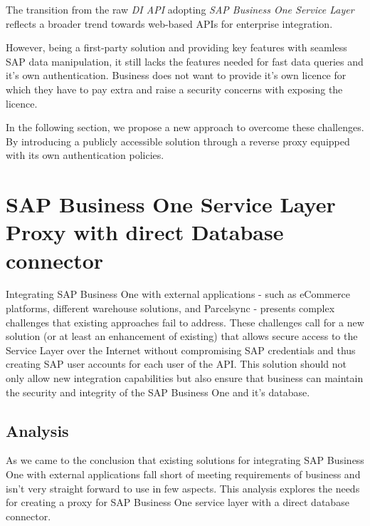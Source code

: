 The transition from the raw \textit{DI API} adopting \textit{SAP Business One Service Layer} reflects a broader trend towards web-based APIs for enterprise integration.

However, being a first-party solution and providing key features with seamless SAP data manipulation, it still lacks the features needed for fast data queries and it's own authentication. Business does not want to provide it's own licence for which they have to pay extra and raise a security concerns with exposing the licence.

In the following section, we propose a new approach to overcome these challenges.
By introducing a publicly accessible solution through a reverse proxy equipped with its own authentication policies.

\section{SAP Business One Service Layer Proxy with direct Database connector}
\label{sec:sap-b1-service-layer-proxy}
Integrating SAP Business One with external applications - such as eCommerce platforms, different warehouse solutions, and Parcelsync - presents complex challenges that existing  approaches fail to address. 
These challenges call for a new solution (or at least an enhancement of existing) that allows secure access to the Service Layer over the Internet without compromising SAP credentials and thus creating SAP user accounts for each user of the API.
This solution should not only allow new integration capabilities but also ensure that business can maintain the security and integrity of the SAP Business One and it's database.

\subsection{Analysis}
\label{subsec:analysis}
As we came to the conclusion that existing solutions for integrating SAP Business One with external applications fall short of meeting requirements of business and isn't very straight forward to use in few aspects.
This analysis explores the needs for creating a proxy for SAP Business One service layer with a direct database connector.

